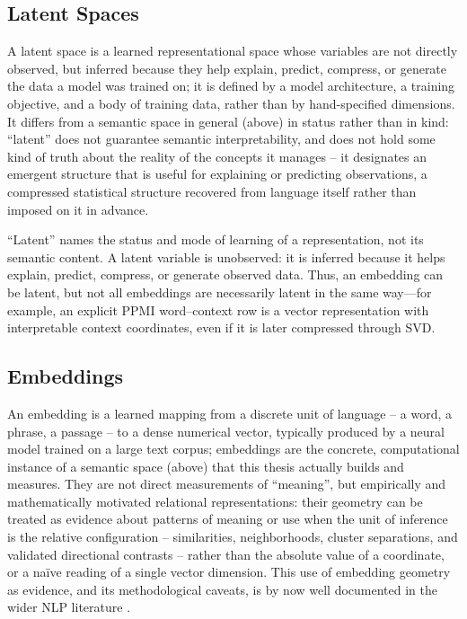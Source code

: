 \subsection{Latent Spaces}
A latent space is a learned representational space whose variables are not directly observed, but inferred because they help explain, predict, compress, or generate the data a model was trained on; it is defined by a model architecture, a training objective, and a body of training data, rather than by hand-specified dimensions. It differs from a semantic space in general (above) in status rather than in kind: \enquote{latent} does not guarantee semantic interpretability, and does not hold some kind of truth about the reality of the concepts it manages -- it designates an emergent structure that is useful for explaining or predicting observations, a compressed statistical structure recovered from language itself rather than imposed on it in advance.


“Latent” names the status and mode of learning of a representation, not its semantic content. A latent variable is unobserved: it is inferred because it helps explain, predict, compress, or generate observed data. Thus, an embedding can be latent, but not all embeddings are necessarily latent in the same way—for example, an explicit PPMI word–context row is a vector representation with interpretable context coordinates, even if it is later compressed through SVD.

\subsection{Embeddings}
An embedding is a learned mapping from a discrete unit of language -- a word, a phrase, a passage -- to a dense numerical vector, typically produced by a neural model trained on a large text corpus; embeddings are the concrete, computational instance of a semantic space (above) that this thesis actually builds and measures. They are not direct measurements of \enquote{meaning}, but empirically and mathematically motivated relational representations: their geometry can be treated as evidence about patterns of meaning or use when the unit of inference is the relative configuration -- similarities, neighborhoods, cluster separations, and validated directional contrasts -- rather than the absolute value of a coordinate, or a naïve reading of a single vector dimension. This use of embedding geometry as evidence, and its methodological caveats, is by now well documented in the wider NLP literature \autocite{worthWordEmbeddingsSemantic2023, simhiInterpretingEmbeddingSpaces2023}.

